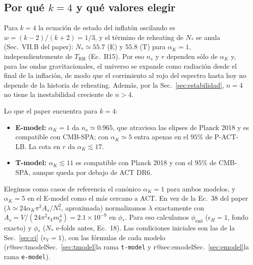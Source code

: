 \documentclass[11pt]{article}
\makeatletter
\newcommand{\reframa}[2]{\ifcsname r@#1\endcsname Sec.~\ref{#1}\else la rama \texttt{#2}\fi}
\makeatother
\begin{document}
        \subsection{Por qué $k = 4$ y qué valores elegir}

            Para $k = 4$ la ecuación de estado del inflatón oscilando es $w = (k-2)/(k+2) = 1/3$, y el término de reheating de $N_*$ se anula (Sec.~VII.B del paper): $N_* \simeq 55.7$ (E) y $55.8$ (T) para $\alpha_K = 1$, independientemente de $T_{\text{RH}}$ (Ec.~B15). Por eso $n_s$ y $r$ dependen sólo de $\alpha_K$ y, para las ondas gravitacionales, el universo se expande como radiación desde el final de la inflación, de modo que el corrimiento al rojo del espectro hasta hoy no depende de la historia de reheating. Además, por la Sec.~\ref{sec:estabilidad}, $n = 4$ no tiene la inestabilidad creciente de $n > 4$.

            Lo que el paper encuentra para $k = 4$:
            \begin{itemize}
                \item \textbf{E-model:} $\alpha_K = 1$ da $n_s \simeq 0.965$, que atraviesa las elipses de Planck 2018 y es compatible con CMB-SPA; con $\alpha_K \simeq 5$ entra apenas en el $95\%$ de P-ACT-LB. La cota en $r$ da $\alpha_K \lesssim 17$.
                \item \textbf{T-model:} $\alpha_K \lesssim 11$ es compatible con Planck 2018 y con el $95\%$ de CMB-SPA, aunque queda por debajo de ACT DR6.
            \end{itemize}
            Elegimos como casos de referencia el canónico $\alpha_K = 1$ para ambos modelos, y $\alpha_K = 5$ en el E-model como el más cercano a ACT. En vez de la Ec.~38 del paper ($\lambda \simeq 24 \alpha_K \pi^2 A_s / N_*^2$, aproximada) normalizamos $\lambda$ exactamente con $A_s = V/(24\pi^2 \epsilon_V m_p^4) = 2.1 \times 10^{-9}$ en $\phi_*$. Para eso calculamos $\phi_{\text{end}}$ ($\epsilon_H = 1$, fondo exacto) y $\phi_*$ ($N_*$ e-folds antes, Ec.~18). Las condiciones iniciales son las de la Sec.~\ref{sec:ci} ($\epsilon_V = 1$), con las fórmulas de cada modelo (\reframa{sec:tmodel}{t-model} y \reframa{sec:emodel}{e-model}).
\end{document}
